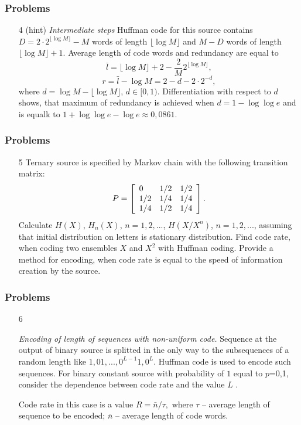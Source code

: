\documentclass[14pt]{beamer}
\begin{document}
\begin{frame}
\frametitle{Problems}
\begin{enumerate}
   
  \item[4 (hint)] 
  \small{ \emph{Intermediate steps} Huffman code for this source contains $D=2\cdot 2^{\lfloor \log M \rfloor} - M$ words of length 
$\lfloor \log M \rfloor$ and  $M-D$ words of length $\lfloor \log M
\rfloor+1$. Average length of code words and redundancy are equal to 
\[
\bar l =\lfloor \log M \rfloor+2-\frac{2}{M}%
2^{\lfloor \log M \rfloor},
\]
\[
r=\bar l - \log M= 2-d-2\cdot 2^{-d},
\]
where $d=\log M - \lfloor \log M \rfloor$, $d\in[0,1)$.
Differentiation with respect to $d$ shows, that maximum of redundancy is achieved when $d=1-\log\log e$ and is equalk to $1+\log\log e - \log e
\approx 0,0861$.
  }
\end{enumerate}
\end{frame}


\begin{frame}
\frametitle{Problems}
\begin{enumerate}
  
  \item[5] 
  \small{ Ternary source is specified by Markov chain with the following transition matrix:
\[
P = \left[ {{\begin{array}{*{20}c}
 0 \hfill & {1 / 2} \hfill & {1 / 2} \hfill \\
 {1 / 2} \hfill & {1 / 4} \hfill & {1 / 4} \hfill \\
 {1 / 4} \hfill & {1 / 2} \hfill & {1 / 4} \hfill \\
\end{array} }} \right].
\]
  Calculate $H\left( X \right)$, $H_n \left( X \right)$,  $n = 1,2,...$, $H\left( {X / X^n} \right)$, $n = 1,2,...$, assuming that initial distribution on letters is stationary distribution.
  Find code rate, when coding two ensembles $X$ and $X^2$ with Huffman coding. Provide a method for encoding, when code rate is equal to the speed of information creation by the source. 
  }
\end{enumerate}
\end{frame}


\begin{frame}
\frametitle{Problems}
\begin{enumerate}
  \item[6] \small{  \emph{Encoding of length of sequences with non-uniform code.} 
  Sequence at the output of binary source is splitted in the only way to the subsequences of a random length like  $1,01,...,0^{L - 1}1,0^L$. 
  Huffman code is used to encode such sequences.
  For binary constant source with probability of $1$ equal to $p$=0,1, consider the dependence between code rate and the value $L$ . 
  
  Code rate in this case is a value $R = \bar{n} / \tau ,$ where \textit{$\tau $} -- average length of sequence to be encoded; $\bar {n}$ -- average length of code words.
}
\end{enumerate}
\end{frame}
\end{document}
